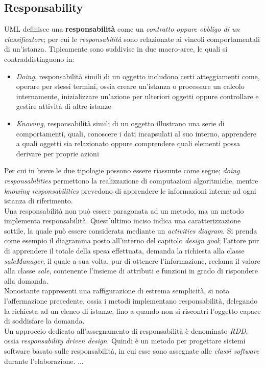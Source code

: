 \documentclass{article}
\begin{document}
\subsection*{Responsability}
\large
UML definisce una \textbf{responsabilità} come un \textit{contratto oppure obbligo di un classificatore}; per cui le \textit{responsabilità} sono relazionate ai vincoli comportamentali di un'istanza. Tipicamente sono suddivise in due macro-aree, le quali si contraddistinguono in:
\begin{itemize}[label={-}]
    \itemsep0em
    \item \textit{Doing}, responsabilità simili di un oggetto includono certi atteggiamenti come, operare per stessi termini, ossia creare un'istanza o processare un calcolo internamente, inizializzare un'azione per ulteriori oggetti oppure controllare e gestire attività di altre istanze
    \item \textit{Knowing}, responsabilità simili di un oggetto illustrano una serie di comportamenti, quali, conoscere i dati incapsulati al suo interno, apprendere a quali oggetti sia relazionato oppure comprendere quali elementi possa derivare per proprie azioni
\end{itemize}
Per cui in breve le due tipologie possono essere riassunte come segue; \textit{doing responsabilities} permettono la realizzazione di computazioni algoritmiche, mentre \textit{knowing responsabilities} prevedono di apprendere le informazioni interne ad ogni istanza di riferimento.\vspace*{14pt}\\
Una responsabilità non può essere paragonata ad un metodo, ma un metodo implementa responsabilità. Quest'ultimo inciso indica una caratterizzazione sottile, la quale può essere considerata mediante un \textit{activities diagram}. Si prenda come esempio il diagramma posto all'interno del capitolo \textit{design goal}; l'attore pur di apprendere il totale della spesa effettuata, demanda la richiesta alla classe \textit{saleManager}, il quale a sua volta, pur di ottenere l'informazione, reclama il valore alla classe \textit{sale}, contenente l'insieme di attributi e funzioni in grado di rispondere alla domanda.\vspace*{14pt}\\
Nonostante rappresenti una raffigurazione di estrema semplicità, si nota l'affermazione precedente, ossia i metodi implementano responsabilità, delegando la richiesta ad un elenco di istanze, fino a quando non si riscontri l'oggetto capace di soddisfare la domanda.\vspace*{14pt}\\
Un approccio dedicato all'assegnamento di responsabilità è denominato \textit{RDD}, ossia \textit{responsability driven design}. Quindi è un metodo per progettare sistemi software basato sulle responsabilità, in cui esse sono assegnate alle \textit{classi software} durante l'elaborazione. ...
\end{document}
